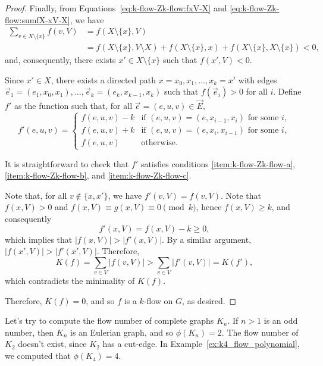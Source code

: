 \begin{proof}
	Finally, from Equations~\eqref{eq:k-flow-Zk-flow:fxV-X}
	and \eqref{eq:k-flow-Zk-flow:sumfX-xV-X}, we have
	\begin{align*}
		\sum_{v \in X \setminus \{x\}} f(v, V)
		& = f(X \setminus \{x\}, V) \\
		& = f(X \setminus \{x\}, V \setminus X) + f(X \setminus \{x\}, x) + f(X \setminus \{x\}, X \setminus \{x\}) < 0,
	\end{align*}
	and, consequently, there exists \(x' \in X \setminus \{x\}\) such that \(f(x', V) < 0\).

	Since \(x' \in X\), there exists a directed path \(x = x_0, x_1, \ldots, x_k = x'\) with edges \(\vec{e}_1 = (e_1, x_0, x_1), \ldots, \vec{e}_k = (e_k, x_{k-1}, x_k)\) such that \(f(\vec{e}_i) > 0\) for all \(i\).
	Define \(f'\) as the function such that, for all \(\vec{e} = (e, u, v) \in \vec{E}\),
	\begin{equation}
		f'(e, u, v) =
		\begin{cases}
			f(e, u, v) - k & \text{if } (e, u, v) = (e, x_{i-1}, x_i) \text{ for some } i, \\
			f(e, u, v) + k & \text{if } (e, u, v) = (e, x_{i}, x_{i-1}) \text{ for some } i, \\
			f(e, u, v) & \text{otherwise}.
		\end{cases}
	\end{equation}

	It is straightforward to check that \(f'\) satisfies conditions \ref{item:k-flow-Zk-flow-a}, \ref{item:k-flow-Zk-flow-b}, and \ref{item:k-flow-Zk-flow-c}.

	Note that, for all \(v \notin \{x, x'\}\), we have \(f'(v, V) = f(v, V)\).
	Note that \(f(x, V) > 0\) and \(f(x, V) \equiv g(x, V) \equiv 0 \pmod{k}\), hence \(f(x, V) \geq k\), and consequently
	\begin{equation}
		f'(x, V) = f(x, V) - k \geq 0,
	\end{equation}
	which implies that \(|f(x, V)| > |f'(x, V)|\).
	By a similar argument, \(|f(x', V)| > |f'(x', V)|\).
	Therefore,
	\begin{equation}
		K(f) = \sum_{v \in V} |f(v, V)| > \sum_{v \in V} |f'(v, V)| = K(f'),
	\end{equation}
	which contradicts the minimality of \(K(f)\).

	Therefore, \(K(f) = 0\), and so \(f\) is a \(k\)-flow on \(G\), as desired.
\end{proof}

Let's try to compute the flow number of complete graphs \(K_n\).
If \(n > 1\) is an odd number, then \(K_n\) is an Eulerian graph, and so \(\phi(K_n) = 2\).
The flow number of \(K_2\) doesn't exist, since \(K_2\) has a cut-edge.
In Example~\ref{ex:k4_flow_polynomial}, we computed that \(\phi(K_4) = 4\).

